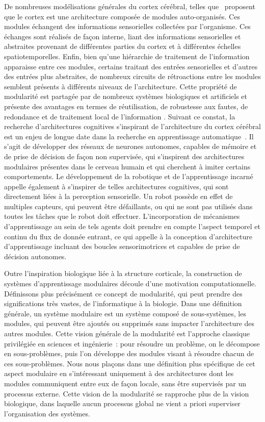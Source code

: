 De nombreuses modélisations générales du cortex cérébral, telles que~\cite{binzegger05, Meunier2009HierarchicalMI,sporns_structure_2013,betzel_multi-scale_2017} proposent que le cortex est une architecture composée de modules auto-organisés. Ces modules échangent des informations sensorielles collectées par l'organisme. Ces échanges sont réalisés de façon interne, liant des informations sensorielles et abstraites provenant de différentes parties du cortex et à différentes échelles spatiotemporelles. Enfin, bien qu'une hiérarchie de traitement de l'information apparaisse entre ces modules, certains traitant des entrées sensorielles et d'autres des entrées plus abstraites, de nombreux circuits de rétroactions entre les modules semblent présents à différents niveaux de l'architecture. 
Cette propriété de modularité est partagée par de nombreux systèmes biologiques et artificiels et présente des avantages en termes de réutilisation, de robustesse aux fautes, de redondance et de traitement local de l'information \parencite{clune_evolutionary_2013}.
Suivant ce constat, la recherche d'architectures cognitives s'inspirant de l'architecture du cortex cérébral est un enjeu de longue date dans la recherche en apprentissage automatique~\parencite{Kotseruba201840YO}. Il s'agit de développer des réseaux de neurones autonomes, capables de mémoire et de prise de décision de façon non supervisée, qui s'inspirent des architectures modulaires présentes dans le cerveau humain et qui cherchent à imiter certains comportements.
Le développement de la robotique et de l'apprentissage incarné appelle également à s'inspirer de telles architectures cognitives, qui sont directement liées à la perception sensorielle.
Un robot possède en effet de multiples capteurs, qui peuvent être défaillants, ou qui ne sont pas utilisés dans toutes les tâches que le robot doit effectuer. L'incorporation de mécanismes d'apprentissage au sein de tels agents doit prendre en compte l'aspect temporel et continu du flux de donnée entrant, ce qui appelle à la conception d'architecture d'apprentissage incluant des boucles sensorimotrices et capables de prise de décision autonomes.

Outre l'inspiration biologique liée à la structure corticale, la construction de systèmes d'apprentissage modulaires découle d'une motivation computationnelle.
Définissons plus précisément ce concept de modularité, qui peut prendre des significations très vastes, de l'informatique à la biologie. 
Dans une définition générale, un système modulaire est un système composé de sous-systèmes, les modules, qui peuvent être ajoutés ou supprimés sans impacter l'architecture des autres modules.
Cette vision générale de la modularité est l'approche classique privilégiée en sciences et ingénierie~: pour résoudre un problème, on le décompose en sous-problèmes, puis l'on développe des modules visant à résoudre chacun de ces sous-problèmes.
Nous nous plaçons dans une définition plus spécifique de cet aspect modulaire en s'intéressant uniquement à des architectures dont les modules communiquent entre eux de façon locale, sans être supervisés par un processus externe.
Cette vision de la modularité se rapproche plus de la vision biologique, dans laquelle aucun processus global ne vient a priori superviser l'organisation des systèmes. 


